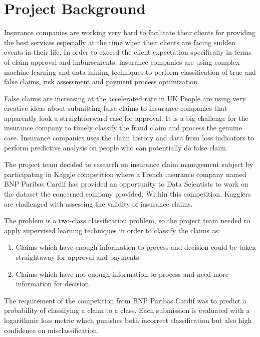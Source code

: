 \documentclass[conference, onecolumn]{IEEEtran}
\begin{document}

\section{Project Background}
Insurance companies are working very hard to facilitate their clients for providing the best services especially at the time when their clients are facing sudden events in their life. 
In order to exceed the client expectation specifically in terms of claim approval and imbursements, insurance companies are using complex machine learning and data mining techniques to perform classification of true and false claims, risk assessment and payment process optimization.

False claims are increasing at the accelerated rate in UK\cite{pb1} People are using very creative ideas about submitting false claims to insurance companies that apparently look a straightforward case for approval.  
It is a big challenge for the insurance company to timely classify the fraud claim and process the genuine case. Insurance companies uses the claim history and data from loss indicators to perform predictive analysis on people who can potentially do false claim.

The project team decided to research on insurance claim management subject by participating in Kaggle competition where a French insurance company named BNP Paribas Cardif has provided an opportunity to Data Scientists to work on the dataset the concerned company provided. Within this competition, Kagglers are challenged with assessing the validity of insurance claims.

The problem is a two-class classification problem, so the project team needed to apply supervised learning techniques in order to classify the claims as:
%
\begin{enumerate}
\item Claims which have enough information to process and decision could be taken straightaway for approval and payments.
\item Claims which have not enough information to process and need more information for decision.
\end{enumerate} 

The requirement of the competition from BNP Paribas Cardif was to predict a probability of classifying a claim to a class. Each submission is evaluated with a logarithmic loss metric which punishes both incorrect classification but also high confidence on misclassification.
\end{document}
